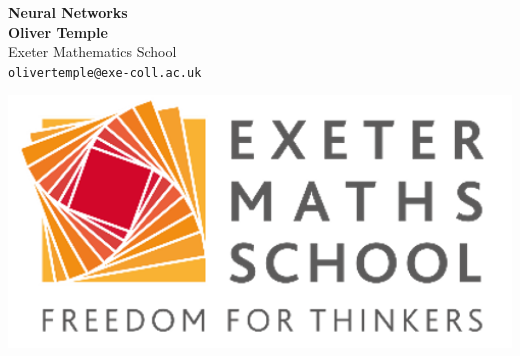 \documentclass[a1,portrait]{a1poster}
\begin{document}
% 

\begin{minipage}[b]{0.6\linewidth}
\Huge \color{DarkRed} \textbf{Neural Networks} \color{Black}
\\ %
\large \textbf{Oliver Temple}\\[0.5cm] %
\large Exeter Mathematics School\\[0.2cm] %
\texttt{olivertemple@exe-coll.ac.uk}\\
\end{minipage}
%
\begin{minipage}[b]{0.4\linewidth}
\includegraphics[width=15cm]{emsnew.PNG}\\
\end{minipage}

\vspace{.5cm} %

\end{document}
